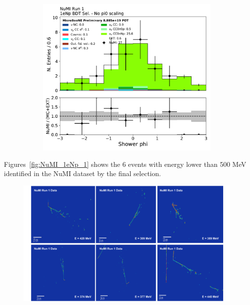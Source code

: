 \begin{figure}[H]
\begin{subfigure}{0.3\textwidth}
    \caption{}
    \end{subfigure}
    \begin{subfigure}{0.3\textwidth}
    \includegraphics[width=1.0\textwidth]{Sidebands/Figures/NuMI/1eNp/BDTSel/shr_phi.pdf}
    \caption{}
    \end{subfigure}
    \caption{} 
    \label{fig:NuMI_1eNp_10}
\end{figure}

Figures~\ref{fig:NuMI_1eNp_1} shows the 6 events with energy lower than 500 MeV identified in the NuMI dataset by the \npsel final selection.


\begin{figure}[H]
    \begin{center}
    \includegraphics[width=\textwidth]{Sidebands/Figures/NuMI/1eNp/BDTSel/Evds.pdf}
    \caption{}
    \label{fig:NuMI_1eNp_11}
    \end{center}
\end{figure}




